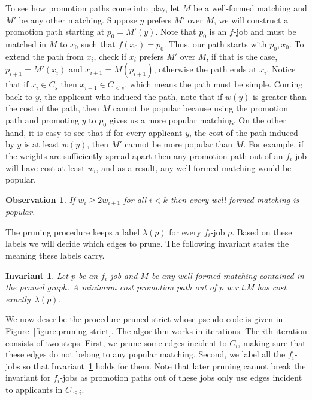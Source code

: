 \documentclass[11pt]{article}
\newcommand{\first}{f}
\newcommand{\lab}{\ensuremath{\lambda}}
\newcommand{\wrt}{{w.r.t.}\xspace}
\newtheorem{invariant}{Invariant}
\newtheorem{observation}{Observation}
\begin{document}
To see how promotion paths come into play, let $M$ be a well-formed matching and $M'$ be any other matching. Suppose $y$ prefers $M'$ over $M$, we will construct a promotion path starting at $p_0 = M'(y)$. Note that $p_0$ is an $\first$-job and must be matched in $M$ to $x_0$ such that $\first(x_0) = p_0$. Thus, our path starts with $p_0, x_0$. To extend the path from $x_i$, check if  $x_i$ prefers $M'$ over $M$, if that is the case, $p_{i+1} = M'(x_i)$ and $x_{i+1} = M(p_{i+1})$, otherwise the path ends at $x_i$. Notice that if $x_i \in C_s$ then $x_{i+1} \in C_{<s}$, which means the path must be simple. Coming back to $y$, the applicant who induced the path, note that if $w(y)$ is greater than the cost of the path, then $M$ cannot be popular because using the promotion path and promoting $y$ to $p_0$ gives us a more popular matching. On the other hand, it is easy to see that if for every applicant $y$, the cost of the path induced by $y$ is at least $w(y)$, then $M'$ cannot be more popular than $M$. For example, if the weights are sufficiently spread apart then any promotion path out of an $f_i$-job will have cost at least $w_i$, and as a result, any well-formed matching would be popular.

\begin{observation} \label{obs:all-popular} If $w_i \geq 2 w_{i+1}$ for all $i < k$ then every well-formed matching is popular.
\end{observation}

The pruning procedure keeps a label $\lab(p)$ for every $f_i$-job $p$. Based on these labels we will decide which edges to prune. The following invariant states the meaning these labels carry.

\begin{invariant} \label{invariant:label} Let $p$ be an $\first_i$-job and $M$ be any well-formed matching contained in the pruned graph. A minimum cost promotion path out of $p$ \wrt $M$ has cost exactly~$\lab(p)$.
\end{invariant}

We now describe the procedure {\sc pruned-strict} whose pseudo-code is given in Figure~\ref{figure:pruning-strict}. The algorithm works in iterations. The $i$th iteration consists of two steps. First, we prune some edges incident to $C_i$, making sure that these edges do not belong to any popular matching. Second, we label all the $f_i$-jobs so that Invariant~\ref{invariant:label} holds for them. Note that later pruning cannot break the invariant for $f_i$-jobs as promotion paths out of these jobs only use edges incident to applicants in $C_{\leq i}$.
\end{document}
